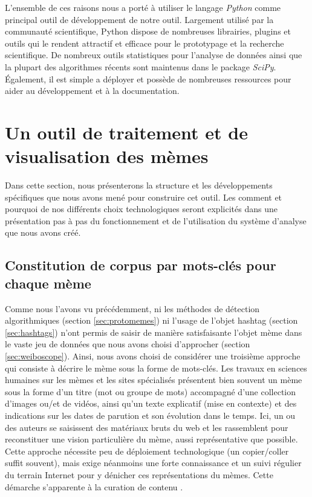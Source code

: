     L'ensemble de ces raisons nous a porté à utiliser le langage \textit{Python} comme principal outil de développement de notre outil. Largement utilisé par la communauté scientifique, Python dispose de nombreuses librairies, plugins et outils qui le rendent attractif et efficace pour le prototypage et la recherche scientifique. De nombreux outils statistiques pour l'analyse de données ainsi que la plupart des algorithmes récents sont maintenus dans le package \textit{SciPy}. Également, il est simple a déployer et possède de nombreuses ressources pour aider au développement et à la documentation.

\section{Un outil de traitement et de visualisation des mèmes}

    Dans cette section, nous présenterons la structure et les développements spécifiques que nous avons mené pour construire cet outil. Les comment et pourquoi de nos différents choix technologiques seront explicités dans une présentation pas à pas du fonctionnement et de l'utilisation du système d'analyse que nous avons créé.

\subsection[Constitution de corpus par mots-clés pour chaque mème]{Constitution de corpus par mots-clés pour chaque mème}
    \label{sec:keywords}

    Comme nous l'avons vu précédemment, ni les méthodes de détection algorithmiques (section \ref{sec:protomemes}) ni l'usage de l'objet hashtag (section \ref{sec:hashtags}) n'ont permis de saisir de manière satisfaisante l'objet mème dans le vaste jeu de données que nous avons choisi d'approcher (section \ref{sec:weiboscope}). Ainsi, nous avons choisi de considérer une troisième approche qui consiste à décrire le mème sous la forme de mots-clés. Les travaux en sciences humaines sur les mèmes \citep{Bauckhage2011, Coscia2013, Knobel2007} et les sites spécialisés \citep{Buchel2012, Bernstein2011} présentent bien souvent un mème sous la forme d{\textquoteright}un titre (mot ou groupe de mots) accompagné d{\textquoteright}une collection d{\textquoteright}images ou/et de vidéos, ainsi qu{\textquoteright}un texte explicatif (mise en contexte) et des indications sur les dates de parution et son évolution dans le temps. Ici, un ou des auteurs se saisissent des matériaux bruts du web et les rassemblent pour reconstituer une vision particulière du mème, aussi représentative que possible. Cette approche nécessite peu de déploiement technologique (un copier/coller suffit souvent), mais exige néanmoins une forte connaissance et un suivi régulier du terrain Internet pour y dénicher ces représentations du mèmes. Cette démarche s{\textquoteright}apparente à la curation de contenu \citep{Buckingham2006}. 

